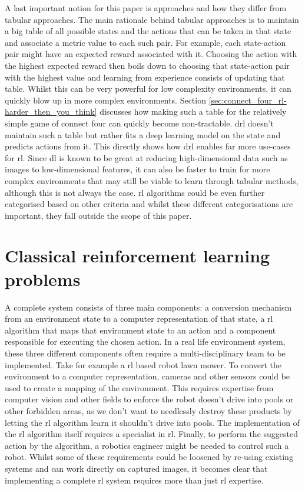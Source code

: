 A last important notion for this paper is  approaches and how they differ from tabular approaches.
The main rationale behind tabular approaches is to maintain a big table of all possible states and the actions that can be taken in that state and associate a metric value to each such pair.
For example, each state-action pair might have an expected reward associated with it.
Choosing the action with the highest expected reward then boils down to choosing that state-action pair with the highest value and learning from experience consists of updating that table.
Whilst this can be very powerful for low complexity environments, it can quickly blow up in more complex environments.
Section \ref{sec:connect_four_rl-harder_then_you_think} discusses how making such a table for the relatively simple game of connect four can quickly become non-tractable.
\Gls{drl} doesn't maintain such a table but rather fits a deep learning model on the state and predicts actions from it.
This directly shows how \gls{drl} enables far more use-cases for \gls{rl}.
Since \gls{dl} is known to be great at reducing high-dimensional data such as images to low-dimensional features, it can also be faster to train for more complex environments that may still be viable to learn through tabular methods, although this is not always the case.
\Gls{rl} algorithms could be even further categorised based on other criteria and whilst these different categorisations are important, they fall outside the scope of this paper.



\section{Classical reinforcement learning problems}
\label{sec:intro-classical_rl}

A complete  system consists of three main components: a conversion mechanism from an environment state to a computer representation of that state, a \gls{rl} algorithm that maps that environment state to an action and a component responsible for executing the chosen action.
In a real life environment system, these three different components often require a multi-disciplinary team to be implemented.
Take for example a \gls{rl} based robot lawn mower.
To convert the environment to a computer representation, cameras and other sensors could be used to create a mapping of the environment.
This requires expertise from computer vision and other fields to enforce the robot doesn't drive into pools or other forbidden areas, as we don't want to needlessly destroy these products by letting the \gls{rl} algorithm learn it shouldn't drive into pools.
The implementation of the \gls{rl} algorithm itself requires a specialist in \gls{rl}.
Finally, to perform the suggested action by the algorithm, a robotics engineer might be needed to control such a robot.
Whilst some of these requirements could be loosened by re-using existing systems and  can work directly on captured images, it becomes clear that implementing a complete \gls{rl} system requires more than just \gls{rl} expertise.

